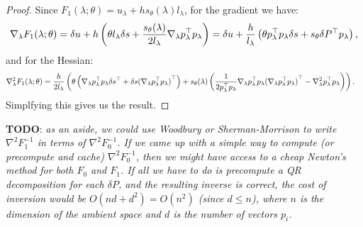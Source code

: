 \documentclass[eikonal.tex]{subfiles}
\begin{document}
\begin{proof}
  Since $F_1(\lambda; \theta) = u_\lambda + h s_\theta(\lambda) l_\lambda$, for the gradient we have:
  \begin{align*}
    \nabla_\lambda F_1(\lambda; \theta) = \delta u + h \left(\theta l_\lambda \delta s + \frac{s_\theta(\lambda)}{2l_\lambda} \nabla_\lambda p_\lambda^\top p_\lambda\right) = \delta u + \frac{h}{l_\lambda} \left(\theta p_\lambda^\top p_\lambda \delta s + s_\theta \delta P^\top p_\lambda\right),
  \end{align*}
  and for the Hessian:
  \begin{align*}
    \nabla_\lambda^2 F_1(\lambda; \theta) &= \frac{h}{2 l_\lambda} \left(\theta \left(\nabla_\lambda p_\lambda^\top p_\lambda \delta s^\top + \delta s {(\nabla_\lambda p_\lambda^\top p_\lambda)}^\top\right) + s_\theta(\lambda) \left(\frac{1}{2 p_\lambda^\top p_\lambda} \nabla_\lambda p_\lambda^\top p_\lambda {(\nabla_\lambda p_\lambda^\top p_\lambda)}^\top - \nabla^2_\lambda p_\lambda^\top p_\lambda\right)\right).
  \end{align*}
  Simplfying this gives us the result.
\end{proof}

\noindent \textbf{TODO}: \emph{as an aside, we could use Woodbury or
  Sherman-Morrison to write $\nabla^2 F_1^{-1}$ in terms of
  $\nabla^2 F_0^{-1}$. If we came up with a simple way to compute (or
  precompute and cache) $\nabla^2 F_0^{-1}$, then we might have access
  to a cheap Newton's method for both $F_0$ and $F_1$. If all we have
  to do is precompute a QR decomposition for each $\delta P$, and the
  resulting inverse is correct, the cost of inversion would be
  $O(nd + d^2) = O(n^2)$ (since $d \leq n$), where $n$ is the
  dimension of the ambient space and $d$ is the number of vectors
  $p_i$.}
\end{document}
